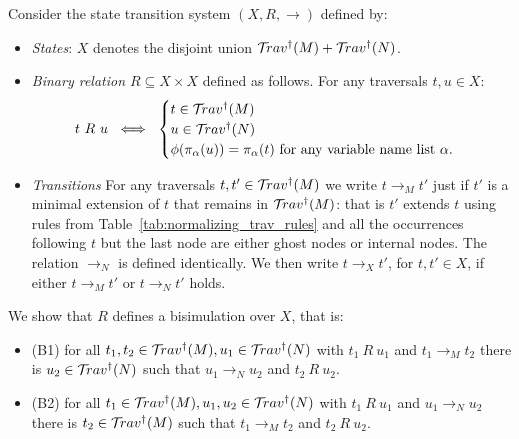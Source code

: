 \documentclass{article}
\theoremstyle{definition}
\def\coresymbol{\pi} %
\begin{document}
Consider the state transition system $(X, R, \rightarrow)$ defined by:
\begin{itemize}
    \item \emph{States}: $X$ denotes the disjoint union $\mathcal{T}\!rav^\dagger(M) + \mathcal{T}\!rav^\dagger(N)$.

    \item \emph{Binary relation $R\subseteq X \times X$} defined as follows. For any traversals $t, u \in X$:
    $$ t~R~u  \ \iff \ \begin{cases}
        t\in\travset^\dagger(M)\\
         u\in\travset^\dagger(N) \\
         \phi(\coresymbol_\alpha(u)) = \coresymbol_\alpha(t) \mbox{ for any  variable name list $\alpha$}.
    \end{cases}
    $$

    \item \emph{Transitions} For any traversals $t, t' \in \mathcal{T}\!rav^\dagger(M)$ we write $t \rightarrow_M t'$ just if $t'$ is a minimal extension of $t$ that remains in $\mathcal{T}\!rav^\dagger(M)$: that is $t'$ extends $t$ using rules from Table~\ref{tab:normalizing_trav_rules} and all the occurrences following $t$ but the last node are either ghost nodes or internal nodes. The relation $\rightarrow_N$ is defined identically.
    We then write $t \rightarrow_X t'$, for $t, t' \in X$, if either $t \rightarrow_M t'$ or $t \rightarrow_N t'$ holds.
\end{itemize}

We show that $R$ defines a bisimulation over $X$, that is:
\begin{itemize}
    \item (B1) for all $t_1, t_2 \in \mathcal{T}\!rav^\dagger(M), u_1 \in \mathcal{T}\!rav^\dagger(N)$ with $t_1~R~u_1$ and $t_1 \rightarrow_M t_2$ there is $u_2 \in \mathcal{T}\!rav^\dagger(N)$ such that $u_1 \rightarrow_N u_2$ and $t_2~R~u_2$.
    \item (B2) for all $t_1 \in \mathcal{T}\!rav^\dagger(M), u_1, u_2 \in \mathcal{T}\!rav^\dagger(N)$ with $t_1~R~u_1$ and $u_1 \rightarrow_N u_2$ there is $t_2 \in \mathcal{T}\!rav^\dagger(M)$ such that $t_1 \rightarrow_M t_2$ and $t_2~R~u_2$.
\end{itemize}


\end{document}
